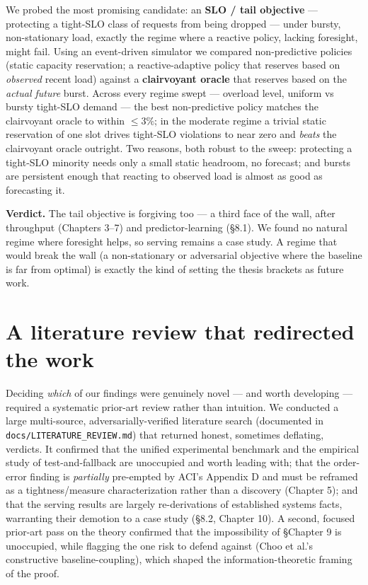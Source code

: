 We probed the most promising candidate: an \textbf{SLO / tail objective} --- protecting a tight-SLO
class of requests from being dropped --- under bursty, non-stationary load, exactly the regime
where a reactive policy, lacking foresight, might fail. Using an event-driven simulator we
compared non-predictive policies (static capacity reservation; a reactive-adaptive policy
that reserves based on \emph{observed} recent load) against a \textbf{clairvoyant oracle} that reserves
based on the \emph{actual future} burst. Across every regime swept --- overload level, uniform vs
bursty tight-SLO demand --- the best non-predictive policy matches the clairvoyant oracle to
within \(\le 3\%\); in the moderate regime a trivial static reservation of one slot drives
tight-SLO violations to near zero and \emph{beats} the clairvoyant oracle outright. Two reasons,
both robust to the sweep: protecting a tight-SLO minority needs only a small static
headroom, no forecast; and bursts are persistent enough that reacting to observed load is
almost as good as forecasting it.

\textbf{Verdict.} The tail objective is forgiving too --- a third face of the wall, after
throughput (Chapters 3--7) and predictor-learning (§8.1). We found no natural regime where
foresight helps, so serving remains a case study. A regime that would break the wall (a
non-stationary or adversarial objective where the baseline is far from optimal) is exactly
the kind of setting the thesis brackets as future work.

\section{A literature review that redirected the work}\label{a-literature-review-that-redirected-the-work}

Deciding \emph{which} of our findings were genuinely novel --- and worth developing --- required a
systematic prior-art review rather than intuition. We conducted a large multi-source,
adversarially-verified literature search (documented in \texttt{docs/LITERATURE\_REVIEW.md}) that
returned honest, sometimes deflating, verdicts. It confirmed that the unified experimental
benchmark and the empirical study of test-and-fallback are unoccupied and worth leading
with; that the order-error finding is \emph{partially} pre-empted by ACI's Appendix D and must be
reframed as a tightness/measure characterization rather than a discovery (Chapter 5); and
that the serving results are largely re-derivations of established systems facts, warranting
their demotion to a case study (§8.2, Chapter 10). A second, focused prior-art pass on the
theory confirmed that the impossibility of §Chapter 9 is unoccupied, while flagging the one
risk to defend against (Choo et al.'s constructive baseline-coupling), which shaped the
information-theoretic framing of the proof.

